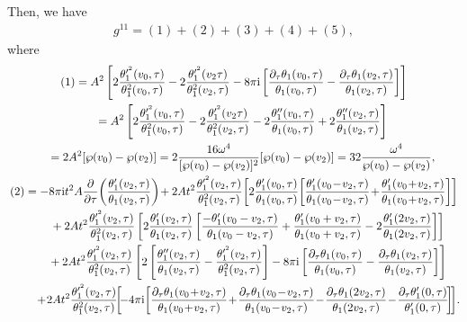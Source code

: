 \documentclass[pdftex]{sigma}%
\numberwithin{equation}{section}
\begin{document}
Then, we have
\begin{gather*}
g^{11}=(1)+(2)+(3)+(4)+(5),
\end{gather*}
where
\begin{gather*}
(1)=A^2\left[ 2\frac{\theta_1^{\prime^2}(v_0,\tau)}{\theta_1^2(v_0,\tau)} -2\frac{\theta_1^{\prime^2}(v_2\tau)}{\theta_1^2(v_2,\tau)} -8\pi {\rm i}\left[\frac{\partial_{\tau}\theta_1(v_0,\tau)}{\theta_1(v_0,\tau)} -\frac{\partial_{\tau}\theta_1(v_2,\tau)}{\theta_1(v_2,\tau)}\right] \right]
\\ \hphantom{(1)}
=A^2\left[ 2\frac{\theta_1^{\prime^2}(v_0,\tau)}{\theta_1^2(v_0,\tau)} -2\frac{\theta_1^{\prime^2}(v_2\tau)}{\theta_1^2(v_2,\tau)} -2\frac{\theta_1^{\prime\prime}(v_0,\tau)}{\theta_1(v_0,\tau)} +2\frac{\theta_1^{\prime\prime}(v_2,\tau)}{\theta_1(v_2,\tau)}\right]
\\\hphantom{(1)}
=2A^2[\wp(v_0)-\wp(v_2)]=2\frac{16\omega^4}{[\wp(v_0)-\wp(v_2)]^2} [\wp(v_0)-\wp(v_2)]=32\frac{\omega^4}{\wp(v_0)-\wp(v_2)},
\\
(2)=-8\pi {\rm i}t^2A\frac{\partial}{\partial \tau}\! \left(\frac{\theta_1^{\prime}(v_2,\tau)}{\theta_1(v_2,\tau)}\right)
\!+2At^2\frac{\theta_1^{\prime^2}(v_2,\tau)}{\theta_1^2(v_2,\tau)} \!\left[2\frac{\theta_1^{\prime}(v_0,\tau)}{\theta_1(v_0,\tau)} \!\left[ \frac{\theta_1^{\prime}(v_0\!-\!v_2,\tau)}{\theta_1(v_0\!-\!v_2,\tau)} \! +\!\frac{\theta_1^{\prime}(v_0\!+\!v_2,\tau)}{\theta_1(v_0\!+\!v_2,\tau)}\right]\right]
\\ \hphantom{(2)=}
+2At^2\frac{\theta_1^{\prime^2}(v_2,\tau)}{\theta_1^2(v_2,\tau)} \left[2\frac{\theta_1^{\prime}(v_2,\tau)}{\theta_1(v_2,\tau)}\left[ \frac{-\theta_1^{\prime}(v_0-v_2,\tau)}{\theta_1(v_0-v_2,\tau)} +\frac{\theta_1^{\prime}(v_0+v_2,\tau)}{\theta_1(v_0+v_2,\tau)} -2\frac{\theta_1^{\prime}(2v_2,\tau)}{\theta_1(2v_2,\tau)}\right]\right]
\\ \hphantom{(2)=}
+2At^2\frac{\theta_1^{\prime^2}(v_2,\tau)}{\theta_1^2(v_2,\tau)} \left[2\left[\frac{\theta_1^{\prime\prime}(v_2,\tau)}{\theta_1(v_2,\tau)} -\frac{\theta_1^{\prime^2}(v_2,\tau)}{\theta_1^2(v_2,\tau)}\right]-8\pi {\rm i}\left[\frac{\partial_{\tau}\theta_1(v_0,\tau)}{\theta_1(v_0,\tau)} -\frac{\partial_{\tau}\theta_1(v_2,\tau)}{\theta_1(v_2,\tau)}\right]\right]
\\ \hphantom{(2)=}
+\!2At^2\frac{\theta_1^{\prime^2}(v_2,\tau)}{\theta_1^2(v_2,\tau)}\!\!\left[\!-4\pi {\rm i}\!\left[\frac{\partial_{\tau}\theta_1(v_0\!+\!v_2,\tau)}{\theta_1(v_0\!+\!v_2,\tau)} \!+\!\frac{\partial_{\tau}\theta_1(v_0\!-\!v_2,\tau)}{\theta_1(v_0\!-\!v_2,\tau)} \!-\!\frac{\partial_{\tau}\theta_1(2v_2,\tau)}{\theta_1(2v_2,\tau)} \!-\!\frac{\partial_{\tau}\theta_1^{\prime}(0,\tau)}{\theta_1^{\prime}(0,\tau)}\!\right]\! \right]\!.
\end{gather*}
\end{document}
